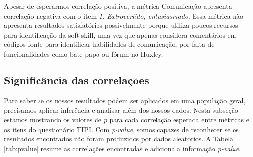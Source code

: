 Apesar de esperarmos correlação positiva, a métrica Comunicação apresenta correlação negativa com o item \textit{1. Extrovertido, entusiasmado}.
Essa métrica não apresenta resultados satisfatórios possivelmente porque utiliza poucos recursos para identificação da soft skill,
uma vez que apenas considera comentários em códigos-fonte para identificar habilidades de comunicação,
por falta de funcionalidades como bate-papo ou fórum no Huxley.

\subsection{Significância das correlações}

Para saber se os nossos resultados podem ser aplicados em uma população geral, precisamos aplicar inferência e analisar além dos nossos dados.
Nesta subseção estamos mostrando os valores de \textit{p} para cada correlação esperada entre métricas e os itens do questionário TIPI.
Com \textit{p-value}, somos capazes de reconhecer se os resultados encontrados não foram produzidos por dados aleatórios.
A Tabela \ref{tab:pvalue} resume as correlações encontradas e adiciona a informação \textit{p-value}.

